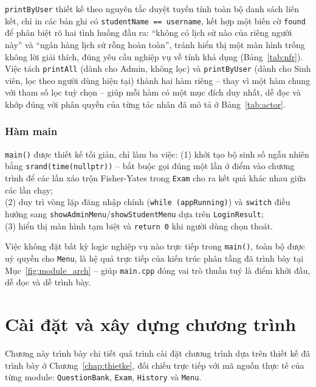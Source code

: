 \documentclass[11pt]{report}
\begin{document}
\texttt{printByUser} thiết kế theo nguyên tắc duyệt tuyến tính toàn bộ danh sách liên kết, chỉ in các bản ghi có \texttt{studentName == username}, kết hợp một biến cờ \texttt{found} để phân biệt rõ hai tình huống đầu ra: ``không có lịch sử nào của riêng người này'' và ``ngân hàng lịch sử rỗng hoàn toàn'', tránh hiển thị một màn hình trống không lời giải thích, đúng yêu cầu nghiệp vụ về tính khả dụng (Bảng~\ref{tab:nfr}). Việc tách \texttt{printAll} (dành cho Admin, không lọc) và \texttt{printByUser} (dành cho Sinh viên, lọc theo người dùng hiện tại) thành hai hàm riêng -- thay vì một hàm chung với tham số lọc tuỳ chọn -- giúp mỗi hàm có một mục đích duy nhất, dễ đọc và khớp đúng với phân quyền của từng tác nhân đã mô tả ở Bảng~\ref{tab:actor}.

\subsection{Hàm main}

\texttt{main()} được thiết kế tối giản, chỉ làm ba việc: 
(1) khởi tạo bộ sinh số ngẫu nhiên bằng \texttt{srand(time(nullptr))} -- bắt buộc gọi đúng một lần ở điểm vào chương trình để các lần xáo trộn Fisher-Yates trong \texttt{Exam} cho ra kết quả khác nhau giữa các lần chạy; \\
(2) duy trì vòng lặp đăng nhập chính (\texttt{while (appRunning)}) và \texttt{switch} điều hướng sang \texttt{showAdminMenu}/\texttt{showStudentMenu} dựa trên \texttt{LoginResult}; \\
(3) hiển thị màn hình tạm biệt và \texttt{return 0} khi người dùng chọn thoát. 

Việc không đặt bất kỳ logic nghiệp vụ nào trực tiếp trong \texttt{main()}, toàn bộ được uỷ quyền cho \texttt{Menu}, là hệ quả trực tiếp của kiến trúc phân tầng đã trình bày tại Mục~\ref{fig:module_arch} -- giúp \texttt{main.cpp} đóng vai trò thuần tuý là điểm khởi đầu, dễ đọc và dễ trình bày.


\chapter{Cài đặt và xây dựng chương trình}
\label{chap:caidat}

Chương này trình bày chi tiết quá trình cài đặt chương trình dựa trên thiết kế đã trình bày ở Chương~\ref{chap:thietke}, đối chiếu trực tiếp với mã nguồn thực tế của từng module: \texttt{QuestionBank}, \texttt{Exam}, \texttt{History} và \texttt{Menu}.
\end{document}
